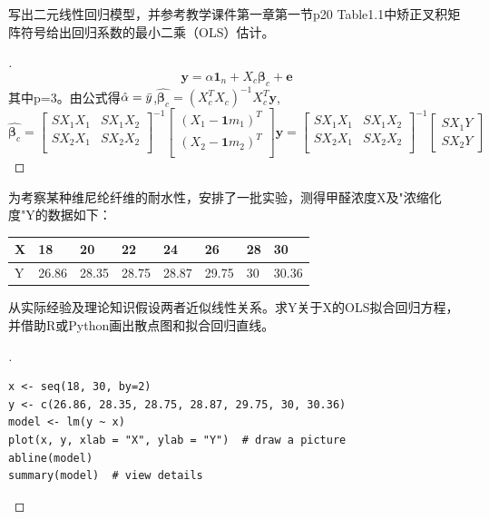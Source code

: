 \documentclass[cn,hazy,green,12pt,normal]{elegantnote}
\numberwithin{equation}{section}
\numberwithin{subsection}{section}
\begin{document}
\begin{homework}
    写出二元线性回归模型，并参考教学课件第一章第一节p20 Table1.1中矫正叉积矩阵符号给出回归系数的最小二乘（OLS）估计。
\end{homework}
\begin{proof}[\solutionname]
\[
    \bm y = \alpha \bm 1_n+X_c \bm \beta_c +\bm e
    \]
    其中p=3。由公式得$\hat{\alpha}=\Bar{y}$,$\hat{\bm \beta_c}=(X_c^TX_c)^{-1}X_c^T\bm y$,
    \[
    \hat{\bm \beta_c}=
    \begin{bmatrix}
        SX_1X_1&SX_1X_2\\
        SX_2X_1&SX_2X_2\\
    \end{bmatrix}^{-1}\begin{bmatrix}
        (X_1-\bm 1 m_1)^T\\
        (X_2-\bm 1 m_2)^T\\
    \end{bmatrix}\bm y
    =\begin{bmatrix}
        SX_1X_1&SX_1X_2\\
        SX_2X_1&SX_2X_2\\
    \end{bmatrix}^{-1}\begin{bmatrix}
        SX_1Y\\
        SX_2Y
    \end{bmatrix}\]
\end{proof}

\begin{homework}
    为考察某种维尼纶纤维的耐水性，安排了一批实验，测得甲醛浓度X及"浓缩化度"Y的数据如下：
    
\begin{tabular}{|l|l|l|l|l|l|l|l|}
\hline
X & 18    & 20    & 22    & 24    & 26    & 28 & 30    \\ \hline
Y & 26.86 & 28.35 & 28.75 & 28.87 & 29.75 & 30 & 30.36 \\ \hline
\end{tabular}

从实际经验及理论知识假设两者近似线性关系。求Y关于X的OLS拟合回归方程，并借助R或Python画出散点图和拟合回归直线。
\end{homework}
\begin{proof}[\solutionname]

\begin{lstlisting}
x <- seq(18, 30, by=2)
y <- c(26.86, 28.35, 28.75, 28.87, 29.75, 30, 30.36)
model <- lm(y ~ x)
plot(x, y, xlab = "X", ylab = "Y")  # draw a picture
abline(model)
summary(model)  # view details
    \end{lstlisting}
\end{proof}
\end{document}
